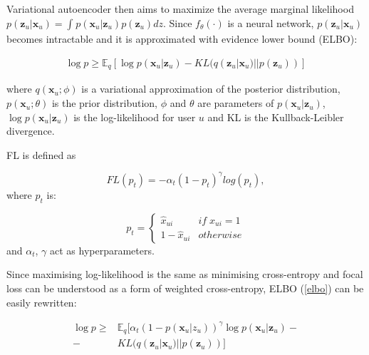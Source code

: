 \documentclass[conference]{IEEEtran}
\begin{document}
        Variational autoencoder then aims to maximize the average marginal likelihood  \(p(\mathbf{z}_u|\mathbf{x}_u)=\int_{}^{}p(\mathbf{x}_u|\mathbf{z}_u)p(\mathbf{z}_u)dz \). Since \(f_\theta(\cdot)\) is a neural network, \(p(\mathbf{z}_u|\mathbf{x}_u)\) becomes intractable and it is approximated with evidence lower bound (ELBO):
        
            \begin{equation}\label{elbo}
                \begin{aligned}
                    \log p \geq  
                    \mathbb{E}_{q}[\log p(\mathbf{x}_u|\mathbf{z}_u)-KL(q(\mathbf{z}_u|\mathbf{x}_u) || p(\mathbf{z}_u))]
                \end{aligned}
            \end{equation}
        
        where \(q(\mathbf{x}_u;\phi)\) is a variational approximation of the posterior
        distribution, \(p(\mathbf{x}_u;\theta)\) is the prior distribution, \(\phi\) and \(\theta\) are parameters of \(p(\mathbf{x}_u|\mathbf{z}_u)\), \(\log p(\mathbf{x}_u|\mathbf{z}_u)\) is the log-likelihood for user \(u\) and KL is the Kullback-Leibler divergence.
        
        FL\cite{Lin2020} is defined as 
        
            \begin{equation}\label{focal_loss} 
                FL(p_t)=-\alpha_t(1-p_t)^\gamma log(p_t),
            \end{equation} where \(p_t\) is:
        
            \begin{equation}\label{p_t} 
                p_t=\begin{cases}\hat{x}_{ui} & if \; x_{ui} = 1\\1 - \hat{x}_{ui}& otherwise\end{cases}
            \end{equation} and \(\alpha_t\), \(\gamma\) act as hyperparameters.
        
        Since maximising log-likelihood is the same as minimising cross-entropy and focal loss can be understood as a form of weighted cross-entropy, ELBO (\ref{elbo}) can be easily rewritten:
        
            \begin{equation}\label{elbo_fl}
                \begin{aligned}
                    \log p \geq &\mathbb{E}_{q}[\alpha_t(1-p(\mathbf{x}_u|z_u))^\gamma\log p(\mathbf{x}_u|\mathbf{z}_u) - \\
                               -&KL(q(\mathbf{z}_u|\mathbf{x}_u) || p(\textbf{z}_u))]
                \end{aligned}
            \end{equation}
    
\end{document}
